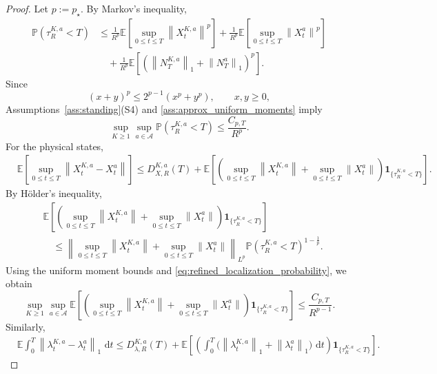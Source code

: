 \documentclass[11pt]{article}
\theoremstyle{remarkitalic}
\theoremstyle{remarkitalic}
\newcommand{\E}{\mathbb E}
\newcommand{\Prob}{\mathbb P}
\newcommand{\dd}{\,\mathrm d}
\newcommand{\1}{\mathbf 1}
\newcommand{\norm}[1]{\left\lVert #1 \right\rVert}
\begin{document}
{\begin{proof}
Let $p:=p_\star.$ By Markov's inequality,
\begin{align}
\Prob(\tau_R^{K,a}<T)
&\leq
\frac{1}{R^p}
\E\left[
    \sup_{0\leq t\leq T}
    \norm{X_t^{K,a}}^p
\right]
+
\frac{1}{R^p}
\E\left[
    \sup_{0\leq t\leq T}
    \norm{X_t^a}^p
\right]
\nonumber\\
&\quad+
\frac{1}{R^p}
\E\left[
    \left(
        \norm{N_T^{K,a}}_1+\norm{N_T^a}_1
    \right)^p
\right].
\label{eq:localization_probability_intermediate}
\end{align}
Since
\[
(x+y)^p
\leq
2^{p-1}(x^p+y^p),
\qquad x,y\geq0,
\]
Assumptions~\ref{ass:standing}(S4) and
\ref{ass:approx_uniform_moments} imply
\begin{equation}
\label{eq:refined_localization_probability}
\sup_{K\geq1}\sup_{a\in\mathcal A}
\Prob(\tau_R^{K,a}<T)
\leq
\frac{C_{p,T}}{R^p}.
\end{equation} For the physical states,
\begin{align}
&\E\left[
    \sup_{0\leq t\leq T}
    \norm{X_t^{K,a}-X_t^a}
\right]
\leq
D_{X,R}^{K,a}(T)
+
\E\left[
\left(
    \sup_{0\leq t\leq T}\norm{X_t^{K,a}}
    +
    \sup_{0\leq t\leq T}\norm{X_t^a}
\right)
\mathbf 1_{\{\tau_R^{K,a}<T\}}
\right].
\label{eq:state_remove_localization}
\end{align}
By Hölder's inequality,
\begin{align*}
&
\E\left[
\left(
    \sup_{0\leq t\leq T}\norm{X_t^{K,a}}
    +
    \sup_{0\leq t\leq T}\norm{X_t^a}
\right)
\mathbf 1_{\{\tau_R^{K,a}<T\}}
\right]
\\
&\quad\leq
\left\|
    \sup_{0\leq t\leq T}\norm{X_t^{K,a}}
    +
    \sup_{0\leq t\leq T}\norm{X_t^a}
\right\|_{L^p}
\Prob(\tau_R^{K,a}<T)^{1-\frac1p}.
\end{align*}
Using the uniform moment bounds and
\eqref{eq:refined_localization_probability}, we obtain
\begin{equation}
\label{eq:state_refined_tail}
\sup_{K\geq1}\sup_{a\in\mathcal A}
\E\left[
\left(
    \sup_{0\leq t\leq T}\norm{X_t^{K,a}}
    +
    \sup_{0\leq t\leq T}\norm{X_t^a}
\right)
\mathbf 1_{\{\tau_R^{K,a}<T\}}
\right]
\leq
\frac{C_{p,T}}{R^{p-1}}.
\end{equation} Similarly,
\begin{align}
&\E\int_0^T
\norm{\lambda_t^{K,a}-\lambda_t^a}_1\,\dd t \leq
D_{\lambda,R}^{K,a}(T)
+
\E\left[
\left(
    \int_0^T
    \bigl(
        \norm{\lambda_t^{K,a}}_1
        +
        \norm{\lambda_t^a}_1
    \bigr)\,\dd t
\right)
\mathbf 1_{\{\tau_R^{K,a}<T\}}
\right].
\label{eq:intensity_remove_localization}

\end{align}
\end{proof}}
\end{document}
